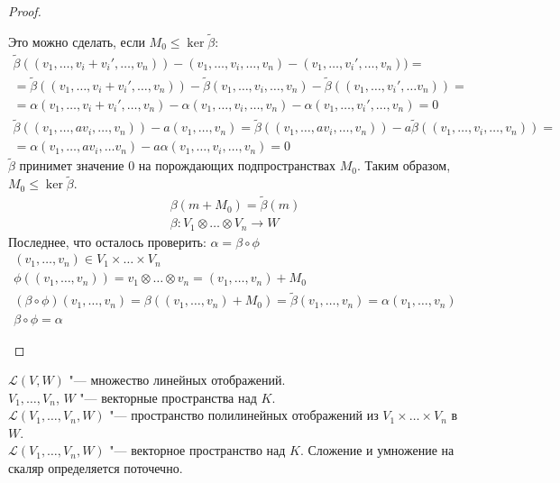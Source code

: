 \begin{description}
\begin{proof}
\begin{description}
		Это можно сделать, если $M_0 \le \ker \tilde \beta$:
		\begin{gather*}
			\tilde \beta((v_1, \dots, v_i + v_i', \dots, v_n)) - (v_1, \dots, v_i, \dots, v_n) - (v_1, \dots, v_i', \dots, v_n)) = \\
			= \tilde \beta((v_1, \dots, v_i + v_i', \dots, v_n)) - \tilde \beta(v_1, \dots, v_i, \dots, v_n)
			- \tilde \beta((v_1, \dots,v_i', \dots v_n)) = \\
			= \alpha(v_1, \dots, v_i + v_i', \dots, v_n) - \alpha(v_1, \dots, v_i, \dots, v_n) - \alpha(v_1, \dots,v_i', \dots,  v_n)
			= 0 \\
			\tilde \beta((v_1, \dots, a v_i,\dots, v_n)) - a(v_1, \dots, v_n)
			= \tilde \beta((v_1, \dots, a v_i, \dots, v_n)) - a \tilde \beta((v_1, \dots, v_i,\dots, v_n)) = \\
			= \alpha(v_1, \dots, a v_i, \dots v_n) - a\alpha(v_1, \dots, v_i, \dots, v_n)
			= 0
		\end{gather*}
		$\tilde \beta$ принимет значение 0 на порождающих подпространствах $M_0$.
		Таким образом, $M_0 \le \ker \tilde \beta$.
		\begin{gather*}
			\beta(m + M_0) = \tilde \beta(m) \\
			\beta \colon V_1 \otimes \dots \otimes V_n \to W
		\end{gather*}
		Последнее, что осталось проверить: $\alpha = \beta \circ \phi$
		\begin{gather*}
			(v_1, \dots, v_n) \in V_1 \times \dots \times V_n \\
			\phi((v_1, \dots, v_n)) = v_1 \otimes \dots \otimes v_n = (v_1, \dots, v_n) + M_0 \\
			(\beta \circ \phi)(v_1, \dots, v_n) = \beta((v_1, \dots, v_n) + M_0)
			= \tilde \beta(v_1, \dots, v_n) = \alpha(v_1, \dots, v_n) \\
			\beta \circ \phi = \alpha
		\end{gather*}
	\end{description}
	\end{proof}
	$\mathcal L(V, W)$ "--- множество линейных отображений.\\
	$V_1, \dots, V_n$, $W$ "--- векторные пространства над $K$.\\
	$\mathcal L(V_1, \dots, V_n, W)$ "--- пространство полилинейных отображений из $V_1 \times \dots \times V_n$ в $W$. \\

	$\mathcal L(V_1, \dots, V_n, W)$ "--- векторное пространство над $K$.
	Сложение и умножение на скаляр определяется поточечно. \\


\end{description}
